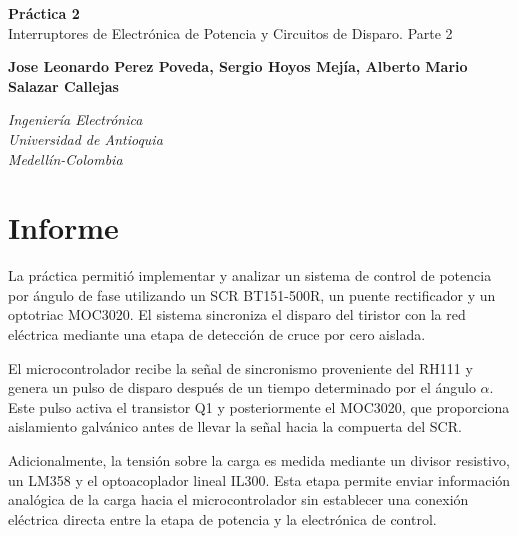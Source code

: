 \documentclass[12pt]{article}
\newcommand{\estudiantes}{
Jose Leonardo Perez Poveda, Sergio Hoyos Mejía, Alberto Mario Salazar Callejas
}
\begin{document}
\vspace*{-1cm}

\begin{center}

{\Huge
\textcolor{tituloazul}{
\textbf{Práctica 2}\\
Interruptores de Electrónica de Potencia y Circuitos de Disparo. Parte 2
}}

\vspace{0.2cm}

{\textbf{\estudiantes}}

\vspace{0.2cm}

\textit{Ingeniería Electrónica}\\
\textit{Universidad de Antioquia}\\
\textit{Medellín-Colombia}

\end{center}

\vspace{0.3cm}


\section{Informe}

La práctica permitió implementar y analizar un sistema de control de potencia por ángulo de fase utilizando un SCR BT151-500R, un puente rectificador y un optotriac MOC3020. El sistema sincroniza el disparo del tiristor con la red eléctrica mediante una etapa de detección de cruce por cero aislada.

El microcontrolador recibe la señal de sincronismo proveniente del RH111 y genera un pulso de disparo después de un tiempo determinado por el ángulo $\alpha$. Este pulso activa el transistor Q1 y posteriormente el MOC3020, que proporciona aislamiento galvánico antes de llevar la señal hacia la compuerta del SCR.

Adicionalmente, la tensión sobre la carga es medida mediante un divisor resistivo, un LM358 y el optoacoplador lineal IL300. Esta etapa permite enviar información analógica de la carga hacia el microcontrolador sin establecer una conexión eléctrica directa entre la etapa de potencia y la electrónica de control.

\end{document}
